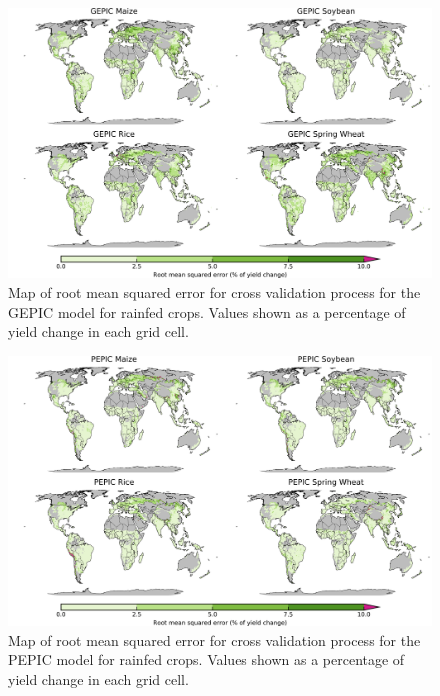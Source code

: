 \documentclass[12pt]{article}
\begin{document}
\begin{figure}[!htb]
  \centering
  \includegraphics[width=15.5cm]{GEPIC_spatial_MSE_ton_ha.png}
  \caption{Map of root mean squared error for cross validation process for the GEPIC model for rainfed crops. Values shown as a percentage of yield change in each grid cell.}
\end{figure}

\begin{figure}[!htb]
  \centering
  \includegraphics[width=15.5cm]{PEPIC_spatial_MSE_ton_ha.png}
  \caption{Map of root mean squared error for cross validation process for the PEPIC model for rainfed crops. Values shown as a percentage of yield change in each grid cell.}
\end{figure}

\clearpage
%
\printbibliography
%
\end{document}

